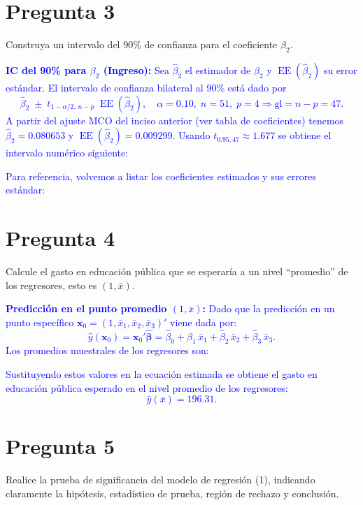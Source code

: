 \documentclass[10pt]{article}
\begin{document}
\section{Pregunta 3}
Construya un intervalo del 90\% de confianza para el coeficiente $\beta_2$. \\

\textcolor{blue}{
    \textbf{IC del 90\% para $\beta_2$ (Ingreso):}
    Sea $\hat\beta_2$ el estimador de $\beta_2$ y $\operatorname{EE}(\hat\beta_2)$ su error estándar. El intervalo de confianza bilateral al 90\% está dado por
    \[
        \hat\beta_2 \;\pm\; t_{1-\alpha/2,\,n-p}\; \operatorname{EE}(\hat\beta_2),\quad \alpha=0.10,\; n=51,\; p=4 \Rightarrow \text{gl}=n-p=47.
    \]
    A partir del ajuste MCO del inciso anterior (ver tabla de coeficientes) tenemos $\hat\beta_2=0.080653$ y $\operatorname{EE}(\hat\beta_2)=0.009299$. Usando $t_{0.95,47}\approx 1.677$ se obtiene el intervalo numérico siguiente:
    
    Para referencia, volvemos a listar los coeficientes estimados y sus errores estándar:
    
}
\section{Pregunta 4}
Calcule el gasto en educación pública que se esperaría a un nivel “promedio” de los regresores, esto es $(1,\bar{x})$. \\

\textcolor{blue}{
    \textbf{Predicción en el punto promedio $(1,\bar x)$:}
    Dado que la predicción en un punto específico $\mathbf{x}_0 = (1,\bar x_1, \bar x_2, \bar x_3)'$ viene dada por:
    \[
        \hat y(\mathbf{x}_0) = \mathbf{x}_0' \hat{\boldsymbol\beta} 
        = \hat\beta_0 + \hat\beta_1\,\bar x_1 + \hat\beta_2\,\bar x_2 + \hat\beta_3\,\bar x_3.
    \]
    Los promedios muestrales de los regresores son:
    
    Sustituyendo estos valores en la ecuación estimada se obtiene el gasto en educación pública esperado en el nivel promedio de los regresores:
    \[
        \hat y(\bar x) = 196.31.
    \]
}

\section{Pregunta 5}
Realice la prueba de significancia del modelo de regresión (1), indicando claramente la hipótesis, estadístico de prueba, región de rechazo y conclusión. \\
\end{document}
